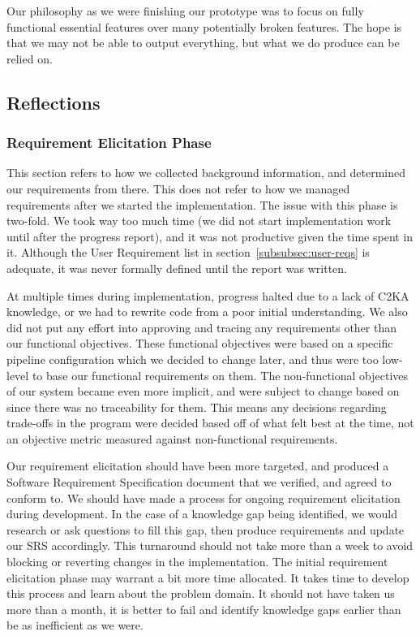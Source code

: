 Our philosophy as we were finishing our prototype was to focus on fully functional essential features over many potentially broken features.
The hope is that we may not be able to output everything, but what we do produce can be relied on.


\subsection{Reflections}\label{subsec:reflections}
\subsubsection{Requirement Elicitation Phase}\label{subsubsec:req-elicit-refl}
This section refers to how we collected background information, and determined our requirements from there.
This does not refer to how we managed requirements after we started the implementation.
The issue with this phase is two-fold.
We took way too much time (we did not start implementation work until after the progress report),
and it was not productive given the time spent in it.
Although the User Requirement list in section~\ref{subsubsec:user-reqs} is adequate,
it was never formally defined until the report was written.

At multiple times during implementation, progress halted due to a lack of C2KA knowledge,
or we had to rewrite code from a poor initial understanding.
We also did not put any effort into approving and tracing any requirements other than our functional objectives.
These functional objectives were based on a specific pipeline configuration which we decided to change later,
and thus were too low-level to base our functional requirements on them.
The non-functional objectives of our system became even more implicit, and were subject to change based on
since there was no traceability for them.
This means any decisions regarding trade-offs in the program were decided based off of what felt best at the time,
not an objective metric measured against non-functional requirements.

Our requirement elicitation should have been more targeted, and produced a Software Requirement Specification document
that we verified, and agreed to conform to.
We should have made a process for ongoing requirement elicitation during development.
In the case of a knowledge gap being identified, we would research or ask questions to fill this gap,
then produce requirements and update our SRS accordingly.
This turnaround should not take more than a week to avoid blocking or reverting changes in the implementation.
The initial requirement elicitation phase may warrant a bit more time allocated.
It takes time to develop this process and learn about the problem domain.
It should not have taken us more than a month,
it is better to fail and identify knowledge gaps earlier than be as inefficient as we were.

